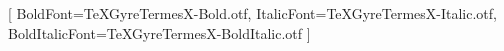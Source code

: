 %
%
%

\usepackage{iftex}

\ifPDFTeX
  \usepackage[T1]{fontenc}
  \usepackage{newtxtext,newtxmath}
\else
  \usepackage{fontspec}
  \setmainfont{TeXGyreTermesX-Regular.otf}[
    BoldFont=TeXGyreTermesX-Bold.otf,
    ItalicFont=TeXGyreTermesX-Italic.otf,
    BoldItalicFont=TeXGyreTermesX-BoldItalic.otf
  ]
\fi


\usepackage{silence}
\usepackage{microtype}

